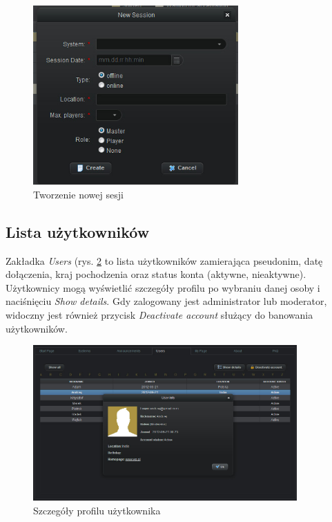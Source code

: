 \begin{figure}[h!]	
\centering
\includegraphics[width=0.7\textwidth]{./img/interfejsy/create_session}
\caption{Tworzenie nowej sesji}
\label{fig:create_session}
\end{figure}




\subsection{Lista użytkowników}
\label{sec:users_detail}
Zakładka \emph{Users} (rys. \ref{fig:users_details} to lista użytkowników zamierająca pseudonim, datę dołączenia, kraj pochodzenia oraz status konta (aktywne, nieaktywne). Użytkownicy mogą wyświetlić szczegóły profilu po wybraniu danej osoby i naciśnięciu \emph{Show details}. Gdy zalogowany jest administrator lub moderator, widoczny jest również przycisk \emph{Deactivate account} służący do banowania użytkowników. 

\begin{figure}[h!]	
\centering
\includegraphics[width=0.9\textwidth]{./img/interfejsy/users_details}
\caption{Szczegóły profilu użytkownika}
\label{fig:users_details}
\end{figure}

